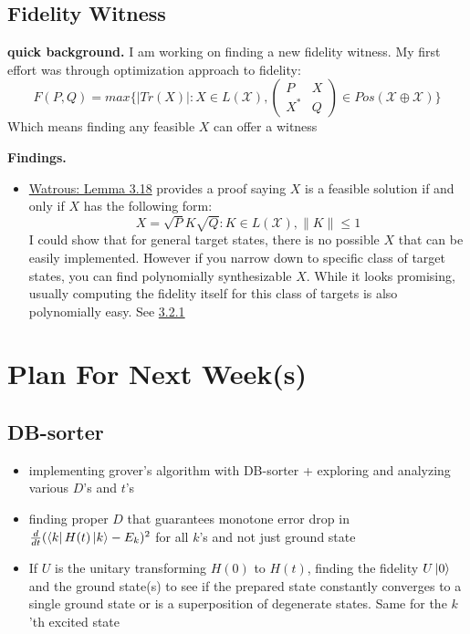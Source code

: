 \documentclass[11pt]{article}
\begin{document}
\subsection{Fidelity Witness}
\textbf{quick background.} I am working on finding a new fidelity witness. My first effort was through optimization approach to fidelity:
$$
F(P, Q) = max\{\lvert Tr(X) \rvert: X \in L(\mathcal{X}), \begin{pmatrix}
  P & X \\
  X^* & Q 
\end{pmatrix} \in Pos(\mathcal{X \oplus X}) \}
$$
Which means finding any feasible $X$ can offer a witness

\textbf{Findings.}
\begin{itemize}
    \item \href{https://cs.uwaterloo.ca/~watrous/TQI/TQI.3.pdf}{Watrous: Lemma 3.18} provides a proof saying $X$ is a feasible solution if and only if $X$ has the following form:
    $$
    X = \sqrt{P}K\sqrt{Q}: K \in L(\mathcal{X}),  \lVert K \rVert \le 1
    $$
    I could show that for general target states, there is no possible $X$ that can be easily implemented. However if you narrow down to specific class of target states, you can find polynomially synthesizable $X$. While it looks promising, usually computing the fidelity itself for this class of targets is also polynomially easy. See \hyperref[sec:fidelity-deadend]{3.2.1} 
\end{itemize}



\section{Plan For Next Week(s)}
\subsection{DB-sorter}
\begin{itemize}
    \item implementing grover's algorithm with DB-sorter + exploring and analyzing various $D$'s and $t$'s
    \item finding proper $D$ that guarantees monotone error drop in $\frac{d}{dt}(\bra{k} H(t) \ket{k} - E_k)^2$ for all $k$'s and not just ground state
    \item If $U$ is the unitary transforming $H(0)$ to $H(t)$, finding the fidelity $U\ket{0}$ and the ground state(s) to see if the prepared state constantly converges to a single ground state or is a superposition of degenerate states. Same for the $k$'th excited state
\end{itemize}
\end{document}
